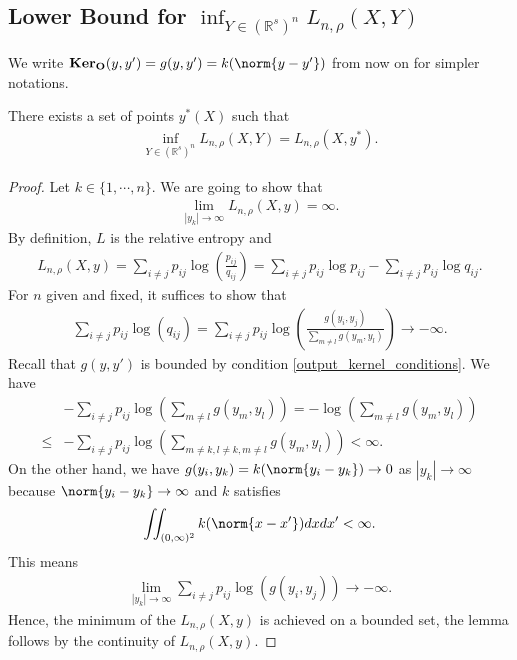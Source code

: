 \subsection{Lower Bound for \texorpdfstring{$\inf_{Y \in (\mathbb{R}^s)^n}L_{n,\rho}(X,Y)$}{L(X,Y)}} \label{tsne:sec:lower_bound}
We write $\ko(y,y') = g(y,y') = k(\norm{y-y'})$ from now on for simpler notations.
\begin{lemma} \label{lower_bound_lemma_1}
    There exists a set of points $y^*(X)$ such that
    \begin{align}
        \inf_{Y \in (\mathbb{R}^s)^n}L_{n,\rho}(X,Y) = L_{n,\rho}(X,y^*).
    \end{align}
\end{lemma}
\begin{proof}
    Let $k \in \{1,\cdots, n\}$. We are going to show that
    \begin{align}
        \lim_{|y_k| \to \infty} L_{n,\rho}(X,y) = \infty.
    \end{align}
    By definition, $L$ is the relative entropy and
    \begin{align}
        L_{n,\rho}(X,y) = \sum_{i \neq j} p_{ij}\log \left(\frac{p_{ij}}{q_{ij}}\right) = \sum_{i \neq j} p_{ij}\log p_{ij} - \sum_{i \neq j} p_{ij}\log q_{ij}.
    \end{align}
    For $n$ given and fixed, it suffices to show that
    \begin{align}
        \sum_{i \neq j} p_{ij}\log (q_{ij}) = \sum_{i \neq j} p_{ij}\log \left(\frac{g(y_i,y_j)}{\sum_{m \neq l}g(y_m,y_l)}\right) \to -\infty.
    \end{align}
    Recall that $g(y,y')$ is bounded by condition \ref{output_kernel_conditions}. We have
    \begin{align}
             & -\sum_{i \neq j} p_{ij} \log \left(\sum_{m \neq l}g(y_m,y_l) \right) = -\log \left(\sum_{m \neq l}g(y_m,y_l) \right) \nonumber \\
        \leq & -\sum_{i \neq j} p_{ij} \log \left(\sum_{m\neq k, l \neq k, m \neq l}g(y_m,y_l) \right) < \infty.
    \end{align}
    On the other hand, we have $g(y_i,y_k) = k (\norm{y_i-y_k}) \to 0$ as $|y_k| \to \infty$ because $\norm{y_i-y_k} \to \infty$ and $k$ satisfies
    \begin{align}
        \iint_{(0,\infty)^2} k(\norm{x-x'}) dxdx' < \infty.
    \end{align}
    This means
    \begin{align}
        \lim_{|y_k| \to \infty}\sum_{i \neq j} p_{ij} \log (g(y_i,y_j)) \to -\infty.
    \end{align}
    Hence, the minimum of the $L_{n,\rho}(X,y)$ is achieved on a bounded set, the lemma follows by the continuity of $L_{n,\rho}(X,y)$.
\end{proof}
